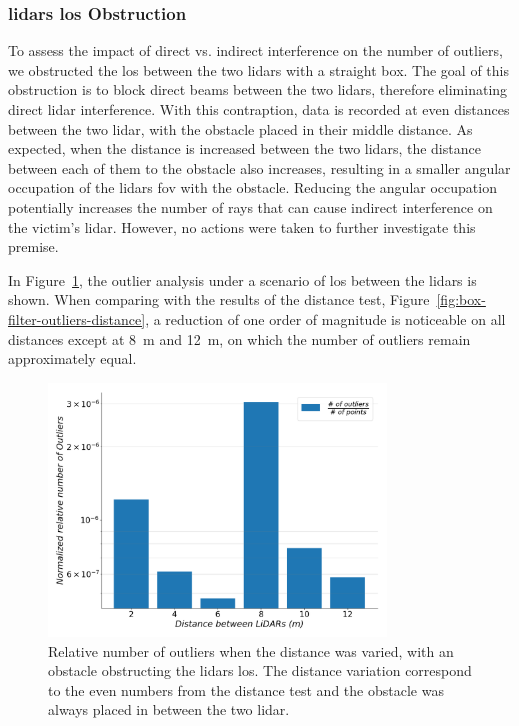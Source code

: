 \subsubsection{\acsp{lidar} \acs{los} Obstruction}
To assess the impact of direct vs. indirect interference on the number of outliers, we obstructed the \acf{los} between the two \acp{lidar} with a straight box. The goal of this obstruction is to block direct beams between the two \acp{lidar}, therefore eliminating direct \ac{lidar} interference. With this contraption, data is recorded at even distances between the two \ac{lidar}, with the obstacle placed in their middle distance. As expected, when the distance is increased between the two \acp{lidar}, the distance between each of them to the obstacle also increases, resulting in a smaller angular occupation of the \acp{lidar} \ac{fov} with the obstacle. Reducing the angular occupation potentially increases the number of rays that can cause indirect interference on the victim's \ac{lidar}. However, no actions were taken to further investigate this premise.

In Figure~\ref{fig:box-filter-outliers-LOS}, the outlier analysis under a scenario of \ac{los} between the \acp{lidar} is shown. When comparing with the results of the distance test, Figure~\ref{fig:box-filter-outliers-distance}, a reduction of one order of magnitude is noticeable on all distances except at \SI{8}{\meter} and \SI{12}{\meter}, on which the number of outliers remain approximately equal. 

\begin{figure}[!ht]
\centering
\includegraphics[width=0.8\textwidth]{img/lidar-interference/box-filtering/interference-box-filter-outliers-LOS.png}
\caption[Relative number of outliers when the \acsp{lidar} \acs{los} is obstructed and the distance between the \acsp{lidar} is varied, on \acs{irislab}.]{Relative number of outliers when the distance was varied, with an obstacle obstructing the \acp{lidar} \ac{los}. The distance variation correspond to the even numbers from the distance test and the obstacle was always placed in between the two \ac{lidar}.}
\label{fig:box-filter-outliers-LOS}
\end{figure}

